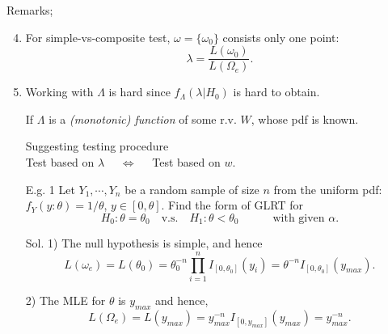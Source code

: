 \begin{frame}
	Remarks;\\[1em]
	\begin{enumerate}
	\setcounter{enumi}{3}
	\item For simple-vs-composite test, $\omega=\{\omega_0\}$ consists only one point: \\[1em]
			\[
		\lambda = \frac{L(\omega_0)}{L(\Omega_e)}.
			\]
		\vfill
	\item Working with $\Lambda$ is hard since $f_\Lambda(\lambda|H_0)$ is hard to obtain. \\[1em]
	\item[] If $\Lambda$ is a {\it (monotonic) function} of some r.v. $W$, whose pdf is known. \\[1em]
	\item[]
		\begin{center}
		Suggesting testing procedure \\[1em]
		Test based on $\lambda$
		$\quad\Longleftrightarrow\quad$
		Test based on $w$.
		\end{center}
	\end{enumerate}
\end{frame}
\begin{frame}
	\begin{enumerate}
		\item[E.g. 1] Let $Y_1,\cdots,Y_n$ be a random sample of size $n$ from the uniform pdf: $f_Y(y:\theta)=1/\theta$, $y\in[0,\theta]$. Find the form of GLRT for
			\[
				H_0: \theta=\theta_0\quad\text{v.s.}
				\quad
				H_1:\theta<\theta_0
				\qquad\quad \text{with given $\alpha$.}
			\]
\vfill
\item[Sol.] 1) The null hypothesis is simple, and hence
	\[
		L(\omega_e) = L(\theta_0) = \theta_0^{-n} \prod_{i=1}^n I_{[0,\theta_0]}(y_i)
		=\theta^{-n}I_{[0,\theta_0]}(y_{max}).
	\]
\item[]	2) The MLE for $\theta$ is $y_{max}$ and hence,
	\[
		L(\Omega_e) = L(y_{max}) =
		y_{max}^{-n}I_{[0,y_{max}]}(y_{max})= y_{max}^{-n}.
	\]
	\end{enumerate}
\end{frame}
